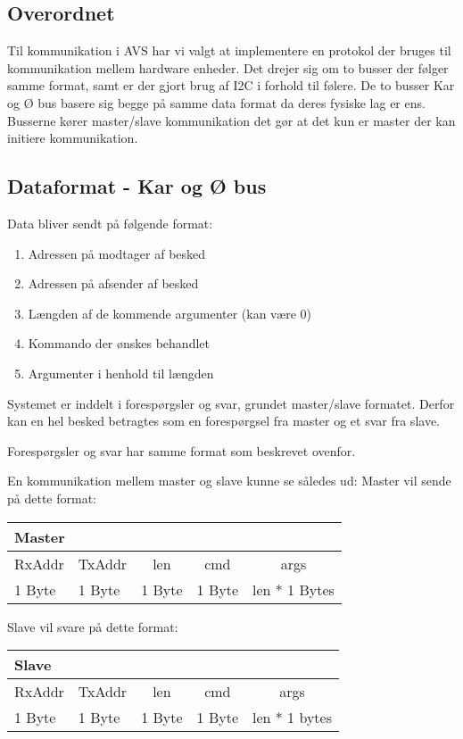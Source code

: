 
\subsection{Overordnet}
Til kommunikation i AVS har vi valgt at implementere en protokol der bruges til kommunikation mellem hardware enheder.
Det drejer sig om to busser der følger samme format, samt er der gjort brug af I2C i forhold til følere. De to busser Kar og Ø bus basere sig begge på samme data format da deres fysiske lag er ens. Busserne kører master/slave kommunikation det gør at det kun er master der kan initiere kommunikation.

\subsection{Dataformat - Kar og Ø bus} 
Data bliver sendt på følgende format:

\begin{enumerate}
\item Adressen på modtager af besked
\item Adressen på afsender af besked
\item Længden af de kommende argumenter (kan være 0)
\item Kommando der ønskes behandlet
\item Argumenter i henhold til længden
\end{enumerate}

Systemet er inddelt i forespørgsler og svar, grundet master/slave formatet. Derfor kan en hel besked betragtes som en forespørgsel fra master og et svar fra slave.

Forespørgsler og svar har samme format som beskrevet ovenfor.

En kommunikation mellem master og slave kunne se således ud:
Master vil sende på dette format:
\begin{table}[H]
\setlength{\parindent}{12pt}
\begin{tabular}{|l|l|c|c|c|}\hline
\multicolumn{5}{|l|}{Master\cellcolor[gray]{0.9}}\\\hline
RxAddr & TxAddr & len & cmd & args \\\hline
1 Byte & 1 Byte & 1 Byte & 1 Byte & len * 1 Bytes \\\hline 
\end{tabular}
\end{table}


Slave vil svare på dette format:
\begin{table}[H]
\setlength{\parindent}{12pt}
\begin{tabular}{|l|l|c|c|c|}\hline
\multicolumn{5}{|l|}{Slave\cellcolor[gray]{0.7}}\\\hline
RxAddr & TxAddr & len & cmd & args  \\\hline
1 Byte & 1 Byte & 1 Byte & 1 Byte & len * 1 bytes \\\hline 
\end{tabular}
\end{table}

